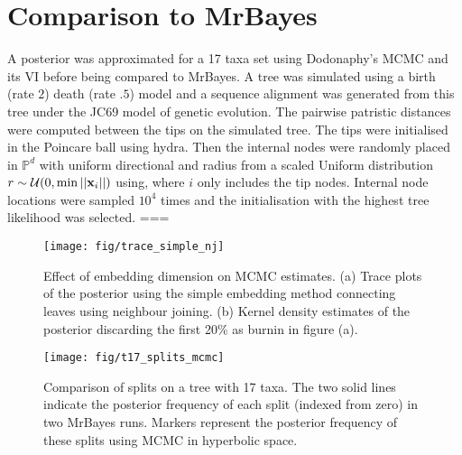 \documentclass[11pt, twocolumn]{article}
\begin{document}

\section{Comparison to MrBayes}
A posterior was approximated for a 17 taxa set using Dodonaphy's MCMC and its VI before being compared to MrBayes.
A tree was simulated using a birth (rate $2$) death (rate $.5$) model and a sequence alignment was generated from this tree under the JC69 model of genetic evolution.
The pairwise patristic distances were computed between the tips on the simulated tree.
The tips were initialised in the Poincare ball using hydra.
Then the internal nodes were randomly placed in $\mathbb{P}^{d}$ with uniform directional and radius from a scaled Uniform distribution $ r \sim \mathcal{U}(0, \min ||\bold{x}_{i}||)$ using, where $i$ only includes the tip nodes.
Internal node locations were sampled $10^{4}$ times and the initialisation with the highest tree likelihood was selected.
===

\begin{figure}[htbp]
\begin{center}
    \texttt{[image: fig/trace\_simple\_nj]}
\end{center}
\caption{Effect of embedding dimension on MCMC estimates. (a) Trace plots of the posterior using the simple embedding method connecting leaves using neighbour joining.
(b) Kernel density estimates of the posterior discarding the first 20\% as burnin in figure (a).}
\end{figure}

\begin{figure}[htbp] \label{fig:splits}
    \begin{center}
        \texttt{[image: fig/t17\_splits\_mcmc]}
    \end{center}
    \caption{Comparison of splits on a tree with 17 taxa.
    The two solid lines indicate the posterior frequency of each split (indexed from zero) in two MrBayes runs.
    Markers represent the posterior frequency of these splits using MCMC in hyperbolic space.}
    \end{figure}
\end{document}

